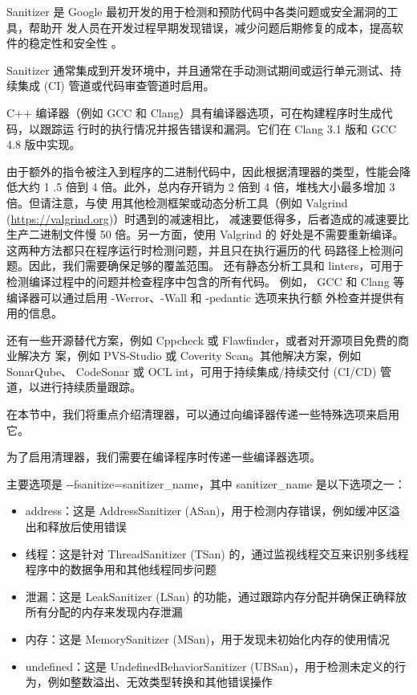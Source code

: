 
Sanitizer 是 Google 最初开发的用于检测和预防代码中各类问题或安全漏洞的工具，帮助开
发人员在开发过程早期发现错误，减少问题后期修复的成本，提高软件的稳定性和安全性
。

Sanitizer 通常集成到开发环境中，并且通常在手动测试期间或运行单元测试、持续集成 (CI)
管道或代码审查管道时启用。

C++ 编译器（例如 GCC 和 Clang）具有编译器选项，可在构建程序时生成代码，以跟踪运
行时的执行情况并报告错误和漏洞。它们在 Clang 3.1 版和 GCC 4.8 版中实现。

由于额外的指令被注入到程序的二进制代码中，因此根据清理器的类型，性能会降低大约 1
.5 倍到 4 倍。此外，总内存开销为 2 倍到 4 倍，堆栈大小最多增加 3 倍。但请注意，与使
用其他检测框架或动态分析工具（例如 Valgrind (\url{https://valgrind.org})）时遇到的减速相比，
减速要低得多，后者造成的减速要比生产二进制文件慢 50 倍。另一方面，使用 Valgrind 的
好处是不需要重新编译。这两种方法都只在程序运行时检测问题，并且只在执行遍历的代
码路径上检测问题。因此，我们需要确保足够的覆盖范围。
还有静态分析工具和 linters，可用于检测编译过程中的问题并检查程序中包含的所有代码。
例如， GCC 和 Clang 等编译器可以通过启用 -Werror、-Wall 和 -pedantic 选项来执行额
外检查并提供有用的信息。

还有一些开源替代方案，例如 Cppcheck 或 Flawfinder，或者对开源项目免费的商业解决方
案，例如 PVS-Studio 或 Coverity Scan。其他解决方案，例如 SonarQube、 CodeSonar 或 OCL
int，可用于持续集成/持续交付 (CI/CD) 管道，以进行持续质量跟踪。

在本节中，我们将重点介绍清理器，可以通过向编译器传递一些特殊选项来启用它。


为了启用清理器，我们需要在编译程序时传递一些编译器选项。

主要选项是 -{}-fsanitize=sanitizer\_name，其中 sanitizer\_name 是以下选项之一：

\begin{itemize}
\item
address：这是 AddressSanitizer (ASan)，用于检测内存错误，例如缓冲区溢出和释放后使用错误

\item
线程：这是针对 ThreadSanitizer (TSan) 的，通过监视线程交互来识别多线程程序中的数据争用和其他线程同步问题

\item
泄漏：这是 LeakSanitizer (LSan) 的功能，通过跟踪内存分配并确保正确释放所有分配的内存来发现内存泄漏

\item
内存：这是 MemorySanitizer (MSan)，用于发现未初始化内存的使用情况

\item
undefined：这是 UndefinedBehaviorSanitizer (UBSan)，用于检测未定义的行为，例如整数溢出、无效类型转换和其他错误操作
\end{itemize}

